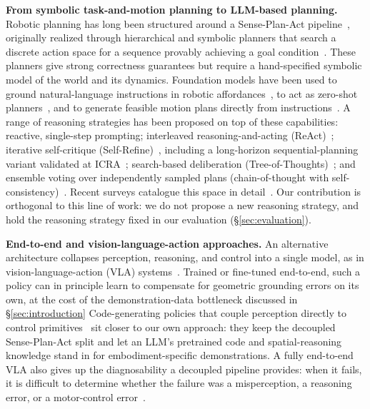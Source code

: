 \textbf{From symbolic task-and-motion planning to LLM-based planning.}
Robotic planning has long been structured around a
Sense-Plan-Act pipeline~\cite{garrett2021integrated}, originally realized
through hierarchical and symbolic planners that search a discrete action
space for a sequence provably achieving a goal
condition~\cite{kaelbling2011hierarchical}. These planners give strong
correctness guarantees but require a hand-specified symbolic model of the
world and its dynamics. Foundation models have been used to
ground natural-language instructions in robotic
affordances~\cite{ahn2022saycan}, to act as zero-shot
planners~\cite{huang2022zeroshot}, and to generate feasible motion plans
directly from instructions~\cite{lin2023text2motion}. A range of reasoning
strategies has been proposed on top of these capabilities: reactive,
single-step prompting; interleaved reasoning-and-acting
(ReAct)~\cite{yao2022react}; iterative self-critique
(Self-Refine)~\cite{madaan2023selfrefine}, including a long-horizon
sequential-planning variant validated at ICRA~\cite{zhou2024isrllm};
search-based deliberation (Tree-of-Thoughts)~\cite{yao2023tot}; and
ensemble voting over independently sampled plans
(chain-of-thought with self-consistency)~\cite{wei2022cot,
wang2022selfconsistency}. Recent surveys catalogue this space in
detail~\cite{kim2024survey, wang2025robotics, huang2024planningsurvey,
berti2025emergent, billard2025roadmap}. Our contribution is orthogonal to
this line of work: we do not propose a new reasoning strategy, and hold
the reasoning strategy fixed in our evaluation (\S\ref{sec:evaluation}).

\textbf{End-to-end and vision-language-action approaches.} An alternative
architecture collapses perception, reasoning, and control into a single
model, as in vision-language-action (VLA) systems~\cite{brohan2023rt2,
driess2023palme, geminiteam2025robotics15, kim2024openvla}. Trained or
fine-tuned end-to-end, such a policy can in principle learn to compensate
for geometric grounding errors on its own, at the cost of the
demonstration-data bottleneck discussed in
\S\ref{sec:introduction} Code-generating policies that couple perception
directly to control primitives~\cite{liang2023codeaspolicies,
huang2023voxposer, huang2022innermonologue, singh2023progprompt} sit
closer to our own approach: they keep the decoupled Sense-Plan-Act split
and let an LLM's pretrained code and spatial-reasoning knowledge stand in
for embodiment-specific demonstrations. A fully end-to-end VLA also gives
up the diagnosability a decoupled pipeline provides: when it fails, it is
difficult to determine whether the failure was a misperception, a
reasoning error, or a motor-control error~\cite{favaliRAS}. 

